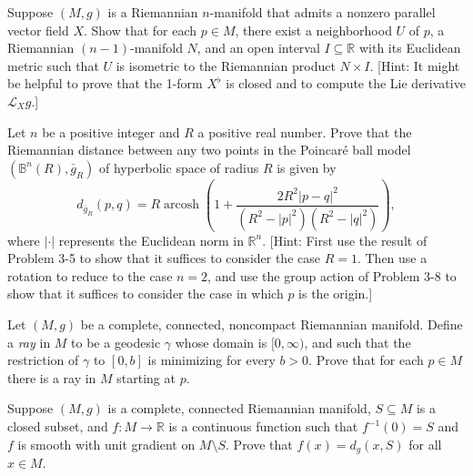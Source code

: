 \begin{exercise}
\label{prob:parallel-vector-field}

Suppose $(M, g)$ is a Riemannian $n$-manifold that admits a nonzero parallel vector field $X$. Show that for each $p \in M$, there exist a neighborhood $U$ of $p$, a Riemannian $(n - 1)$-manifold $N$, and an open interval $I \subseteq \mathbb{R}$ with its Euclidean metric such that $U$ is isometric to the Riemannian product $N \times I$. [Hint: It might be helpful to prove that the 1-form $X^\flat$ is closed and to compute the Lie derivative $\mathcal{L}_X g$.]
\end{exercise}

\begin{exercise}
\label{prob:poincare-ball-distance-formula}

Let $n$ be a positive integer and $R$ a positive real number. Prove that the Riemannian distance between any two points in the Poincaré ball model $(\mathbb{B}^n(R), \bar{g}_R)$ of hyperbolic space of radius $R$ is given by
\[
d_{\bar{g}_R}(p,q) = R \operatorname{arcosh}\left(1 + \frac{2R^2|p-q|^2}{(R^2 - |p|^2)(R^2 - |q|^2)}\right),
\]
where $|\cdot|$ represents the Euclidean norm in $\mathbb{R}^n$. [Hint: First use the result of Problem 3-5 to show that it suffices to consider the case $R = 1$. Then use a rotation to reduce to the case $n = 2$, and use the group action of Problem 3-8 to show that it suffices to consider the case in which $p$ is the origin.]
\end{exercise}

\begin{exercise}
\label{prob:ray-definition}

Let $(M,g)$ be a complete, connected, noncompact Riemannian manifold. Define a \emph{ray} in $M$ to be a geodesic $\gamma$ whose domain is $[0,\infty)$, and such that the restriction of $\gamma$ to $[0,b]$ is minimizing for every $b > 0$. Prove that for each $p \in M$ there is a ray in $M$ starting at $p$.
\end{exercise}

\begin{exercise}
\label{prob:smooth-function-equals-distance}

Suppose $(M, g)$ is a complete, connected Riemannian manifold, $S \subseteq M$ is a closed subset, and $f : M \to \mathbb{R}$ is a continuous function such that $f^{-1}(0) = S$ and $f$ is smooth with unit gradient on $M \setminus S$. Prove that $f(x) = d_g(x, S)$ for all $x \in M$.
\end{exercise}

